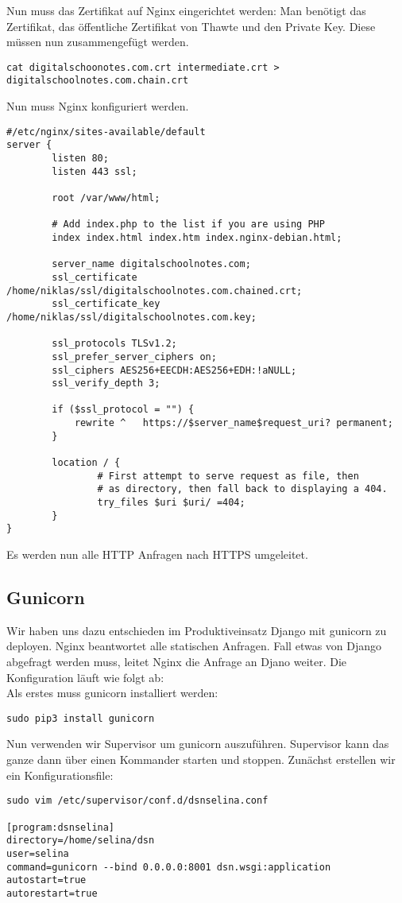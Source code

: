 \documentclass[12pt,a4paper,oneside,ngerman]{scrartcl}
\begin{document}
Nun muss das Zertifikat auf Nginx eingerichtet werden\cite{CERT:3}:
Man benötigt das Zertifikat, das öffentliche Zertifikat von Thawte und den Private Key.
Diese müssen nun zusammengefügt werden.
\begin{lstlisting}
cat digitalschoonotes.com.crt intermediate.crt > digitalschoolnotes.com.chain.crt
\end{lstlisting}
Nun muss Nginx konfiguriert werden.
\begin{lstlisting}
#/etc/nginx/sites-available/default
server {
        listen 80;
        listen 443 ssl;

        root /var/www/html;

        # Add index.php to the list if you are using PHP
        index index.html index.htm index.nginx-debian.html;

        server_name digitalschoolnotes.com;
        ssl_certificate /home/niklas/ssl/digitalschoolnotes.com.chained.crt;
        ssl_certificate_key /home/niklas/ssl/digitalschoolnotes.com.key;

        ssl_protocols TLSv1.2;
        ssl_prefer_server_ciphers on;
        ssl_ciphers AES256+EECDH:AES256+EDH:!aNULL;
        ssl_verify_depth 3;

        if ($ssl_protocol = "") {
            rewrite ^   https://$server_name$request_uri? permanent;
        }

        location / {
                # First attempt to serve request as file, then
                # as directory, then fall back to displaying a 404.
                try_files $uri $uri/ =404;
        }
}
\end{lstlisting}
Es werden nun alle HTTP Anfragen nach HTTPS umgeleitet.

\subsection{Gunicorn}
Wir haben uns dazu entschieden im Produktiveinsatz Django mit gunicorn zu deployen. Nginx beantwortet alle statischen Anfragen. Fall etwas von Django abgefragt werden muss, leitet Nginx die Anfrage an Djano weiter. Die Konfiguration läuft wie folgt ab\cite{GUNICORN:1}:\\
Als erstes muss gunicorn installiert werden:
\begin{lstlisting}
sudo pip3 install gunicorn
\end{lstlisting}
Nun verwenden wir Supervisor um gunicorn\cite{GUNICORN:2} auszuführen. Supervisor kann das ganze dann über einen Kommander starten und stoppen. Zunächst erstellen wir ein Konfigurationsfile:
\begin{lstlisting}
sudo vim /etc/supervisor/conf.d/dsnselina.conf

[program:dsnselina]
directory=/home/selina/dsn
user=selina
command=gunicorn --bind 0.0.0.0:8001 dsn.wsgi:application
autostart=true
autorestart=true
\end{lstlisting}
\end{document}
